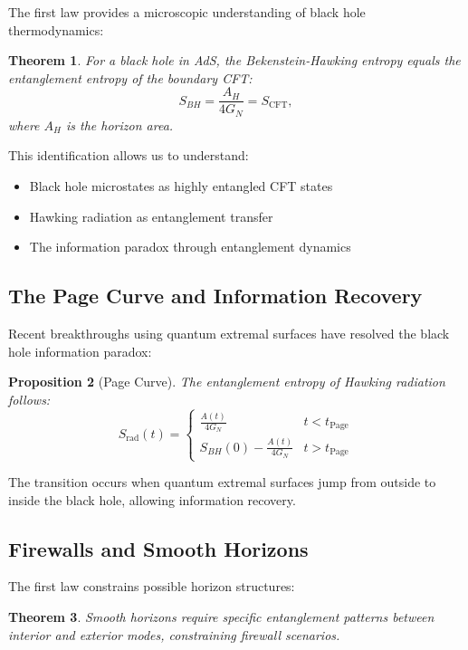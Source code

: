 \documentclass[11pt,letterpaper]{article}
\newtheorem{theorem}{Theorem}[section]
\newtheorem{proposition}[theorem]{Proposition}
\begin{document}
The first law provides a microscopic understanding of black hole thermodynamics:

\begin{theorem}
For a black hole in AdS, the Bekenstein-Hawking entropy equals the entanglement entropy of the boundary CFT:
\begin{equation}
S_{BH} = \frac{A_H}{4G_N} = S_{\text{CFT}},
\end{equation}
where $A_H$ is the horizon area.
\end{theorem}

This identification allows us to understand:
\begin{itemize}
\item Black hole microstates as highly entangled CFT states
\item Hawking radiation as entanglement transfer
\item The information paradox through entanglement dynamics
\end{itemize}

\subsection{The Page Curve and Information Recovery}

Recent breakthroughs using quantum extremal surfaces have resolved the black hole information paradox:

\begin{proposition}[Page Curve]
The entanglement entropy of Hawking radiation follows:
\begin{equation}
S_{\text{rad}}(t) = \begin{cases}
\frac{A(t)}{4G_N} & t < t_{\text{Page}}\\
S_{BH}(0) - \frac{A(t)}{4G_N} & t > t_{\text{Page}}
\end{cases}
\end{equation}
\end{proposition}

The transition occurs when quantum extremal surfaces jump from outside to inside the black hole, allowing information recovery.

\subsection{Firewalls and Smooth Horizons}

The first law constrains possible horizon structures:

\begin{theorem}
Smooth horizons require specific entanglement patterns between interior and exterior modes, constraining firewall scenarios.
\end{theorem}
\end{document}
